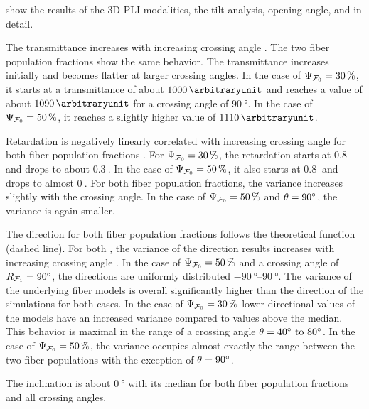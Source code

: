 % 
 show the results of the \ac{3D-PLI} modalities, the tilt analysis, opening angle, \accvalue{} and \rvalue{} in detail.
\par
The transmittance increases with increasing crossing angle \modelOmega{}.
The two fiber population fractions \modelPsi{} show the same behavior.
The transmittance increases initially and becomes flatter at larger crossing angles.
In the case of $\textnormal{$\Psi_{\textnormal{$\mathcal{F}_0$}}$} = \SI{30}{\percent}$, it starts at a transmittance of about $\SI{1000}{\arbitraryunit}$ and reaches a value of about $\SI{1090}{\arbitraryunit}$ for a crossing angle of $\SI{90}{\degree}$.
In the case of $\textnormal{$\Psi_{\textnormal{$\mathcal{F}_0$}}$} = \SI{50}{\percent}$, it reaches a slightly higher value of $\SI{1110}{\arbitraryunit}$.
\par
Retardation is negatively linearly correlated with increasing crossing angle for both fiber population fractions \modelPsi{}.
For $\textnormal{$\Psi_{\textnormal{$\mathcal{F}_0$}}$}=\SI{30}{\percent}$, the retardation starts at $\SI{0.8}{}$ and drops to about $\SI{0.3}{}$.
In the case of $\textnormal{$\Psi_{\textnormal{$\mathcal{F}_0$}}$}=\SI{50}{\percent}$, it also starts at $\SI{0.8}{}$ and drops to almost $\SI{0}{}$.
For both fiber population fractions, the variance increases slightly with the crossing angle.
In the case of $\textnormal{$\Psi_{\textnormal{$\mathcal{F}_0$}}$}=\SI{50}{\percent}$ and $\textnormal{$\theta$}=\SI{90}{\degree}$, the variance is again smaller.
\par
The direction for both fiber population fractions \modelPsi{} follows the theoretical  function (dashed line).
For both \modelPsi{}, the variance of the direction results increases with increasing crossing angle \modelOmega{}.
In the case of $\textnormal{$\Psi_{\textnormal{$\mathcal{F}_0$}}$}=\SI{50}{\percent}$ and a crossing angle of $\textnormal{$R_{\textnormal{$\mathcal{F}_1$}}$} = \SI{90}{\degree}$, the directions are uniformly distributed $\SIrange{-90}{90}{\degree}$.
The \bvariance{} variance of the underlying fiber models is overall significantly higher than the direction of the simulations for both \modelPsi{} cases.
In the case of $\textnormal{$\Psi_{\textnormal{$\mathcal{F}_0$}}$}{}=\SI{30}{\percent}$ lower directional values of the models have an increased variance compared to values above the median.
This behavior is maximal in the range of a crossing angle $\modelOmega = \SIrange{40}{80}{\degree}$.
In the case of $\textnormal{$\Psi_{\textnormal{$\mathcal{F}_0$}}$}=\SI{50}{\percent}$, the \bvariance{} variance occupies almost exactly the range between the two fiber populations with the exception of $\textnormal{$\theta$}=\SI{90}{\degree}$.
\par
The inclination is about $\SI{0}{\degree}$ with its median for both fiber population fractions and all crossing angles.
